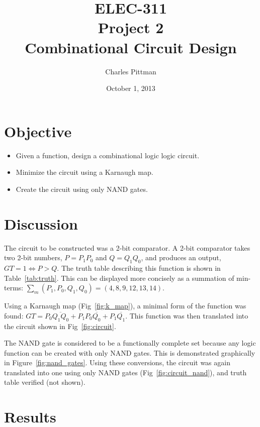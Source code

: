 \documentclass{article}
\author{Charles Pittman}
\title{ELEC-311\\ Project 2\\ Combinational Circuit Design}
\date{October 1, 2013}
\begin{document}
\maketitle %

\pagebreak


\section{Objective}
\label{sec:objective}

\begin{itemize}
\item Given a function, design a combinational logic logic circuit.
\item Minimize the circuit using a Karnaugh map.
\item Create the circuit using only NAND gates.
\end{itemize}

\section{Discussion}
\label{sec:procedure}

The circuit to be constructed was a 2-bit comparator.  A 2-bit
comparator takes two 2-bit numbers, $P = P_1P_0$ and $Q = Q_1Q_0$, and
produces an output, $GT=1 \iff P>Q$.  The truth table describing this
function is shown in Table~\ref{tab:truth}.  This can be displayed
more concisely as a summation of min-terms: $\sum_m(P_1, P_0, Q_1,
Q_0) = (4, 8, 9, 12, 13,14)$.

Using a Karnaugh map (Fig~\ref{fig:k_map}), a minimal form of the
function was found: $GT = P_0 \overline{Q_1 Q_0} + P_1 P_0
\overline{Q_0} + P_1 \overline{Q_1}$.  This function was then
translated into the circuit shown in Fig~\ref{fig:circuit}.

The NAND gate is considered to be a functionally complete set because
any logic function can be created with only NAND gates.  This is
demonstrated graphically in Figure~\ref{fig:nand_gates}.  Using these conversions,
the circuit was again translated into one using only NAND gates
(Fig~\ref{fig:circuit_nand}), and truth table verified (not shown).

\section{Results}
\label{sec:results}
\end{document}
